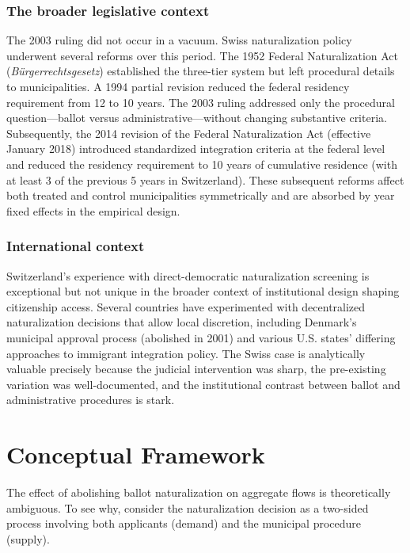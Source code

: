 \documentclass[12pt]{article}
\begin{document}
\subsubsection*{The broader legislative context} The 2003 ruling did not occur in a vacuum. Swiss naturalization policy underwent several reforms over this period. The 1952 Federal Naturalization Act (\textit{B\"{u}rgerrechtsgesetz}) established the three-tier system but left procedural details to municipalities. A 1994 partial revision reduced the federal residency requirement from 12 to 10 years. The 2003 ruling addressed only the procedural question---ballot versus administrative---without changing substantive criteria. Subsequently, the 2014 revision of the Federal Naturalization Act (effective January 2018) introduced standardized integration criteria at the federal level and reduced the residency requirement to 10 years of cumulative residence (with at least 3 of the previous 5 years in Switzerland). These subsequent reforms affect both treated and control municipalities symmetrically and are absorbed by year fixed effects in the empirical design.

\subsubsection*{International context} Switzerland's experience with direct-democratic naturalization screening is exceptional but not unique in the broader context of institutional design shaping citizenship access. Several countries have experimented with decentralized naturalization decisions that allow local discretion, including Denmark's municipal approval process (abolished in 2001) and various U.S. states' differing approaches to immigrant integration policy. The Swiss case is analytically valuable precisely because the judicial intervention was sharp, the pre-existing variation was well-documented, and the institutional contrast between ballot and administrative procedures is stark.


\section{Conceptual Framework}\label{sec:framework}

The effect of abolishing ballot naturalization on aggregate flows is theoretically ambiguous. To see why, consider the naturalization decision as a two-sided process involving both applicants (demand) and the municipal procedure (supply).
\end{document}
